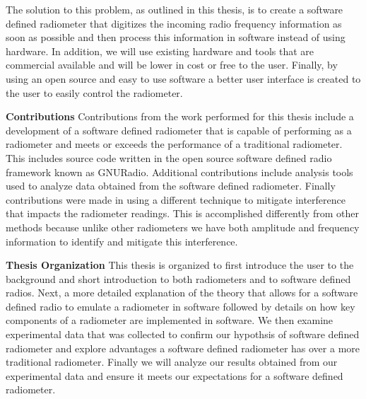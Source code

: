 The solution to this problem, as outlined in this thesis, is to create a software defined radiometer that digitizes the incoming radio frequency information as soon as possible and then process this information in software instead of using hardware.  In addition, we will use existing hardware and tools that are commercial available and will be lower in cost or free to the user.  Finally, by using an open source and easy to use software a better user interface is created to the user to easily control the radiometer. 

\textbf{Contributions}
Contributions from the work performed for this thesis include a development of a software defined radiometer that is capable of performing as a radiometer and meets or exceeds the performance of a traditional radiometer.  This includes source code written in the open source software defined radio framework known as GNURadio.  Additional contributions include analysis tools used to analyze data obtained from the software defined radiometer.  Finally contributions were made in using a different technique to mitigate interference that impacts the radiometer readings.  This is accomplished differently from other methods because unlike other radiometers we have both amplitude and frequency information to identify and mitigate this interference.

\textbf{Thesis Organization}
This thesis is organized to first introduce the user to the background and short introduction to both radiometers and to software defined radios.  Next, a more detailed explanation of the theory that allows for a software defined radio to emulate a radiometer in software followed by details on how key components of a radiometer are implemented in software.  We then examine experimental data that was collected to confirm our hypothsis of software defined radiometer and explore advantages a software defined radiometer has over a more traditional radiometer.  Finally we will analyze our results obtained from our experimental data and ensure it meets our expectations for a software defined radiometer.

